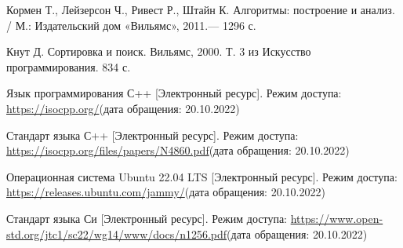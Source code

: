 \renewcommand{\bibname}{Список использованных источников}

\begin{thebibliography}{10}
	Кормен Т., Лейзерсон Ч., Ривест Р., Штайн К. Алгоритмы: построение и анализ. / М.: Издательский дом «Вильямс», 2011.— 1296 с.
	
	Кнут Д. Сортировка и поиск. Вильямс, 2000. Т. 3 из Искусство программирования. 834 с.
	
	Язык программирования С++ [Электронный ресурс]. Режим доступа: 
	\url{https://isocpp.org/}(дата обращения: 20.10.2022)
	
	Стандарт языка С++ [Электронный ресурс]. Режим доступа:
	\url{https://isocpp.org/files/papers/N4860.pdf}(дата обращения: 20.10.2022) 
	
	Операционная система Ubuntu 22.04 LTS [Электронный ресурс]. Режим доступа: 
	\url{https://releases.ubuntu.com/jammy/}(дата обращения: 20.10.2022)
	
	Стандарт языка Си [Электронный ресурс]. Режим доступа: 
	\url{https://www.open-std.org/jtc1/sc22/wg14/www/docs/n1256.pdf}(дата обращения: 20.10.2022) 
	
	
	
\end{thebibliography}





